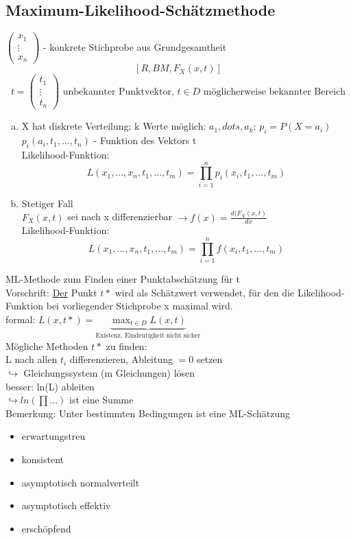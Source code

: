 \documentclass[a4paper,12pt]{scrartcl}
\begin{document}
  
  \subsection{Maximum-Likelihood-Schätzmethode}
  
  $\begin{pmatrix}
    x_1\\\vdots\\x_n
   \end{pmatrix}$ - konkrete Stichprobe aus Grundgesamtheit
   $$[R,BM,F_X(x,t)]$$
   $$t=\begin{pmatrix}
    t_1\\\vdots\\t_n
   \end{pmatrix} \text{ unbekannter Punktvektor, }t\in D\text{ möglicherweise bekannter Bereich}$$
   \begin{enumerate}[(a)]
    \item X hat diskrete Verteilung; k Werte möglich: $a_1,dots,a_k$; $p_i=P(X=a_i)$\\
    $p_i(a_i,t_1,\dots,t_n)$ - Funktion des Vektors t\\
    Likelihood-Funktion: $$L(x_1,\dots,x_n,t_1,\dots,t_m) = \prod_{i=1}^n p_i(x_i,t_1,\dots,t_m)$$
    \item Stetiger Fall\\
    $F_X(x,t)$ sei nach x differenzierbar $\to f(x)=\frac{d(F_X(x,t)}{dx}$\\
    Likelihood-Funktion:
    $$L(x_1,\dots,x_n,t_1,\dots,t_m) = \prod_{i=1}^n f(x_i,t_1,\dots,t_m)$$
   \end{enumerate}
 ML-Methode zum Finden einer Punktabschätzung für t\\
 Vorschrift: \underline{Der} Punkt $t*$ wird als Schätzwert verwendet, für den die Likelihood-Funktion bei vorliegender Stichprobe x maximal wird.\\
 formal: $L(x,t*) = \underbrace{\max_{t\in D}L(x,t)}_{\text{Existenz, Eindeutigkeit nicht sicher}}$\\
 Mögliche Methoden $t*$ zu finden:\\
 L nach allen $t_i$ differenzieren, Ableitung $= 0$ setzen\\
 $\hookrightarrow$ Gleichungssystem (m Gleichungen) lösen\\
 besser: ln(L) ableiten\\
 $\hookrightarrow ln(\prod\dots)$ ist eine Summe\\
 Bemerkung: Unter bestimmten Bedingungen ist eine ML-Schätzung
 \begin{itemize}
  \item erwartungstreu
  \item konsistent
  \item asymptotisch normalverteilt
  \item asymptotisch effektiv
  \item erschöpfend
 \end{itemize}
 
\end{document}

